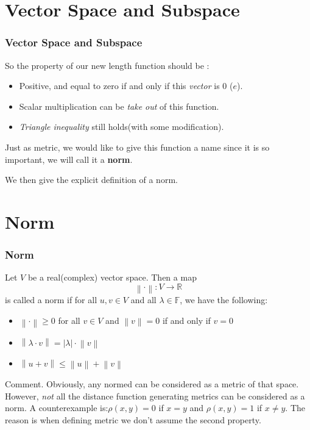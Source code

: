 \documentclass[12pt, t]{beamer}
\renewcommand{\emph}[1]{{\color{Turquoise3}\textsl{#1}}}
\begin{document}
\section{Vector Space and Subspace}
\begin{frame}
    \frametitle{Vector Space and Subspace}
    So the property of our new length function should be :
    \begin{itemize}
        \item Positive, and equal to zero if and only if this \emph{vector} is 0 ($e$).
        \item Scalar multiplication can be \emph{take out} of this function.
        \item \emph{Triangle inequality} still holds(with some modification).
    \end{itemize}
    \vspace{1em}
    Just as metric, we would like to give this function a name since it is so important, we will call it a \textbf{norm}.

    \vspace{1em}
    We then give the explicit definition of a norm.
\end{frame}

\section{Norm}
\begin{frame}
    \frametitle{Norm}
    \hspace{1em}
    Let $V$ be a real(complex) vector space. Then a map
    \begin{equation*}
        \left\lVert \cdot \right\rVert :V\rightarrow \mathbb{R}
    \end{equation*}
    is called a norm if for all $u,v\in V$ and all $\lambda\in\mathbb{F}$, we have the following:
    \begin{itemize}
        \item $\left\lVert \cdot \right\rVert\geq 0$ for all $v\in V$ and $\left\lVert v\right\rVert =0$ if and only if $v=0$
        \item $\left\lVert\lambda\cdot v \right\rVert =|\lambda|\cdot \left\lVert v\right\rVert $
        \item $\left\lVert u+v\right\rVert \leq \left\lVert u\right\rVert +\left\lVert v\right\rVert $
    \end{itemize}
    \vspace{1em}
    Comment.  Obviously, any normed can be considered as a metric of that space. However, \emph{not} all the distance function generating metrics can be
    considered as a norm. A counterexample is:$\rho(x,y)=0$ if $x=y$ and $\rho(x,y)=1$ if $x\neq y$. The reason is when defining metric we don't assume
    the second property.

\end{frame}
\end{document}
